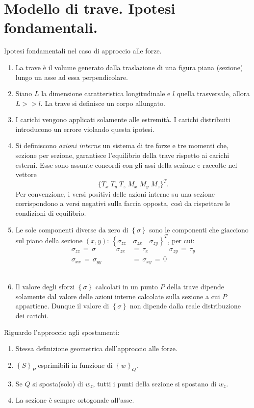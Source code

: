\section{Modello di trave. Ipotesi fondamentali.}
Ipotesi fondamentali nel caso di approccio alle forze.
\begin{enumerate}
    \item La trave è il volume generato dalla traslazione di una figura piana (sezione) lungo un asse ad essa perpendicolare.\\
    \item Siano $L$ la dimensione caratteristica longitudinale e $l$ quella trasversale, allora $L>>l$. La trave si definisce un corpo allungato.\\
    \item I carichi vengono applicati solamente alle estremità. I carichi distribuiti introducono un errore violando questa ipotesi.\\
    \item Si definiscono \emph{azioni interne} un sistema di tre forze e tre momenti che, sezione per sezione, garantisce l’equilibrio della trave rispetto ai carichi esterni. Esse sono assunte concordi con gli assi della sezione e raccolte nel vettore 
\[
\{T_x \; T_y \; T_z \; M_x \; M_y \; M_z\}^T.
\] 
Per convenzione, i versi positivi delle azioni interne su una sezione corrispondono a versi negativi sulla faccia opposta, così da rispettare le condizioni di equilibrio.\\

    
    \item Le sole componenti diverse da zero di $\left\{\sigma\right\}$ sono le componenti che giacciono sul piano della sezione $(x,y)$: $\left\{ \sigma_{zz} \quad \sigma_{zx} \quad \sigma_{zy} \right\}^T$, per cui:
    \begin{align*}
        \sigma_{zz} \,=\, \sigma \quad\quad\quad \sigma_{zx}\,&=\,\tau_x \quad\quad\quad \sigma_{zy} \,=\,\tau_y\\
         \sigma_{xx}\,=\,\sigma_{yy}\,&=\,\sigma_{xy}\,=\,0
    \end{align*}\\
    \item Il valore degli sforzi $\left\{\sigma\right\}$ calcolati in un punto $P$ della trave dipende solamente dal valore delle azioni interne calcolate sulla sezione a cui $P$ appartiene. Dunque il valore di $\left\{\sigma\right\}$ non dipende dalla reale distribuzione dei carichi.
\end{enumerate}

Riguardo l'approccio agli spostamenti:
\begin{enumerate}
    \item Stessa definizione geometrica dell'approccio alle forze.\\
    \item $\left\{S\right\}_P$ esprimibili in funzione di $\left\{w\right\}_Q$.\\
    \item Se $Q$ si sposta(solo) di $w_z$, tutti i punti della sezione si spostano di $w_z$.\\
    \item La sezione è sempre ortogonale all'asse.
\end{enumerate}